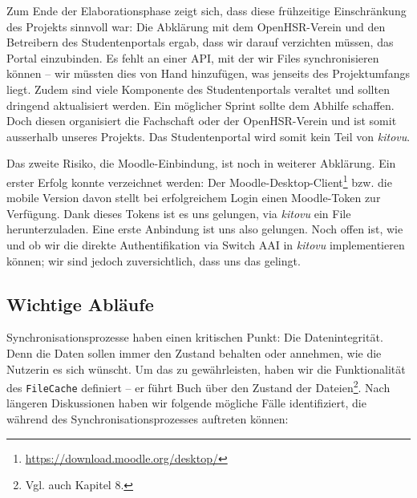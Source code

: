 \documentclass[a4paper]{article}
\begin{document}
Zum Ende der Elaborationsphase zeigt sich, dass diese frühzeitige Einschränkung des Projekts sinnvoll war: Die Abklärung mit dem OpenHSR-Verein und den Betreibern des Studentenportals ergab, dass wir darauf verzichten müssen, das Portal einzubinden. Es fehlt an einer API, mit der wir Files synchronisieren können -- wir müssten dies von Hand hinzufügen, was jenseits des Projektumfangs liegt. Zudem sind viele Komponente des Studentenportals veraltet und sollten dringend aktualisiert werden. Ein möglicher Sprint sollte dem Abhilfe schaffen. Doch diesen organisiert die Fachschaft oder der OpenHSR-Verein und ist somit ausserhalb unseres Projekts. Das Studentenportal wird somit kein Teil von \emph{kitovu}.

Das zweite Risiko, die Moodle-Einbindung, ist noch in weiterer Abklärung. Ein erster Erfolg konnte verzeichnet werden: Der Moodle-Desktop-Client\footnote{\url{https://download.moodle.org/desktop/}} bzw. die mobile Version davon stellt bei erfolgreichem Login einen Moodle-Token zur Verfügung. Dank dieses Tokens ist es uns gelungen, via \emph{kitovu} ein File herunterzuladen. Eine erste Anbindung ist uns also gelungen. Noch offen ist, wie und ob wir die direkte Authentifikation via Switch AAI in \emph{kitovu} implementieren können; wir sind jedoch zuversichtlich, dass uns das gelingt.

\subsection{Wichtige Abläufe}

Synchronisationsprozesse haben einen kritischen Punkt: Die Datenintegrität. Denn die Daten sollen immer den Zustand behalten oder annehmen, wie die Nutzerin es sich wünscht. Um das zu gewährleisten, haben wir die Funktionalität des \verb|FileCache| definiert -- er führt Buch über den Zustand der Dateien\footnote{Vgl. auch Kapitel 8.}. Nach längeren Diskussionen haben wir folgende mögliche Fälle identifiziert, die während des Synchronisationsprozesses auftreten können:
\end{document}
